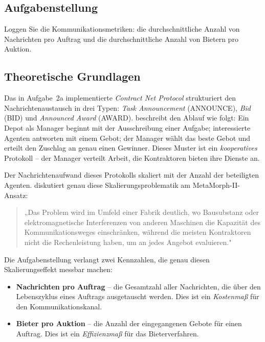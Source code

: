 \subsection{Aufgabenstellung}

Loggen Sie die Kommunikationsmetriken: die durchschnittliche Anzahl von Nachrichten pro Auftrag und die durchschnittliche Anzahl von Bietern pro Auktion.

\subsection{Theoretische Grundlagen}

Das in Aufgabe~2a implementierte \textit{Contract Net Protocol} strukturiert den Nachrichtenaustausch in drei Typen: \textit{Task Announcement} (ANNOUNCE), \textit{Bid} (BID) und \textit{Announced Award} (AWARD). \textcite[S. 30\,f.]{5} beschreibt den Ablauf wie folgt: Ein Depot als Manager beginnt mit der Ausschreibung einer Aufgabe; interessierte Agenten antworten mit einem Gebot; der Manager wählt das beste Gebot und erteilt den Zuschlag an genau einen Gewinner. Dieses Muster ist ein \textit{kooperatives} Protokoll -- der Manager verteilt Arbeit, die Kontraktoren bieten ihre Dienste an.

Der Nachrichtenaufwand dieses Protokolls skaliert mit der Anzahl der beteiligten Agenten. \textcite[S. 32]{5} diskutiert genau diese Skalierungsproblematik am MetaMorph-II-Ansatz: 

\begin{quote}
„Das Problem wird im Umfeld einer Fabrik deutlich, wo Bausubstanz oder elektromagnetische Interferenzen von anderen Maschinen die Kapazität des Kommunikationsweges einschränken, während die meisten Kontraktoren nicht die Rechenleistung haben, um an jedes Angebot evaluieren."
\end{quote}

Die Aufgabenstellung verlangt zwei Kennzahlen, die genau diesen Skalierungseffekt messbar machen:

\begin{itemize}
    \item \textbf{Nachrichten pro Auftrag} -- die Gesamtzahl aller Nachrichten, die über den Lebenszyklus eines Auftrags ausgetauscht werden. Dies ist ein \textit{Kostenmaß} für den Kommunikationskanal.
    \item \textbf{Bieter pro Auktion} -- die Anzahl der eingegangenen Gebote für einen Auftrag. Dies ist ein \textit{Effizienzmaß} für das Bieterverfahren.
\end{itemize}

